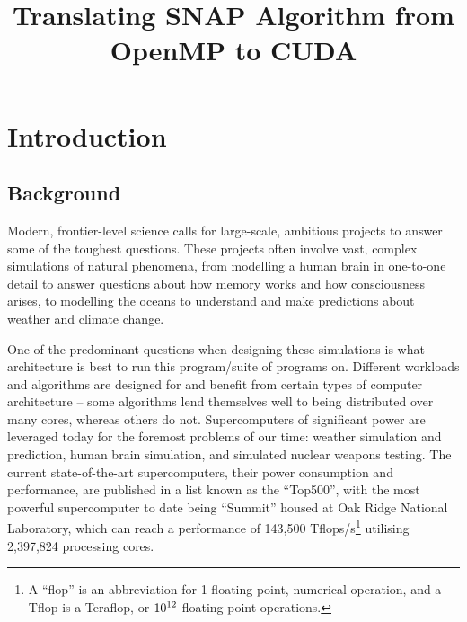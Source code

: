 \documentclass[conference]{IEEEtran}
\begin{document}
\title{Translating SNAP Algorithm from OpenMP to CUDA}

\author{
}

\maketitle


\begin{abstract}



\end{abstract}


\section{Introduction}

\subsection{Background}

Modern, frontier-level science calls for large-scale, ambitious projects to answer some of the toughest questions. These projects often involve vast, complex simulations of natural phenomena, from modelling a human brain in one-to-one detail to answer questions about how memory works and how consciousness arises, to modelling the oceans to understand and make predictions about weather and climate change.

One of the predominant questions when designing these simulations is what architecture is best to run this program/suite of programs on. Different workloads and algorithms are designed for and benefit from certain types of computer architecture – some algorithms lend themselves well to being distributed over many cores, whereas others do not. Supercomputers of significant power are leveraged today for the foremost problems of our time: weather simulation and prediction\cite{metoffice}, human brain simulation\cite{humanbrain}, and simulated nuclear weapons testing\cite{nuclear}. The current state-of-the-art supercomputers, their power consumption and performance, are published in a list known as the ``Top500”\cite{top500}, with the most powerful supercomputer to date being ``Summit” housed at Oak Ridge National Laboratory, which can reach a performance of 143,500 Tflops/s\footnote{A ``flop” is an abbreviation for 1 floating-point, numerical operation, and a Tflop is a Teraflop, or $10\textsuperscript{12}$ floating point operations.} utilising 2,397,824 processing cores.
\end{document}
